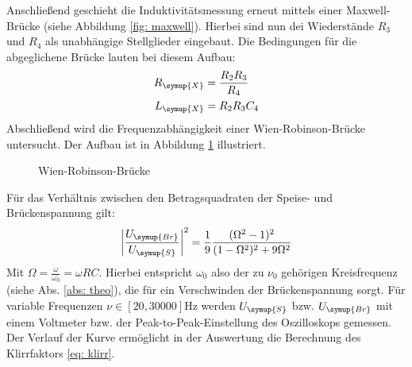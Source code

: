 Anschließend geschieht die Induktivitätsmessung erneut mittels einer Maxwell-Brücke (siehe Abbildung \ref{fig: maxwell}).
Hierbei sind nun dei Wiederstände $R_3$ und $R_4$ als unabhängige Stellglieder eingebaut. Die Bedingungen für die abgeglichene Brücke lauten
bei diesem Aufbau:
\begin{align}
  \begin{aligned}
    R_{\symup{X}} &=\frac{R_2 R_3}{R_4} \\
    L_{\symup{X}} &= R_2 R_3 C_4
  \end{aligned}
  \label{eq: Lx_maxwell}
\end{align}
Abschließend wird die Frequenzabhängigkeit einer Wien-Robinson-Brücke untersucht. Der Aufbau ist in Abbildung
 \ref{fig: wienrob} illustriert.
\begin{figure}
  \centering
  \caption{Wien-Robinson-Brücke\cite{anleitung302}}
  \label{fig: wienrob}
\end{figure}
Für das Verhältnis zwischen den Betragsquadraten der Speise- und Brückenspannung gilt:
\begin{equation}
  \left| \frac{U_{\symup{Br}}}{U_{\symup{S}}}\right|^2 = \frac{1}{9} \frac{(\Omega^2 - 1)^2 }{(1 - \Omega ^2)^2 + 9 \Omega ^2}
\end{equation}
Mit $\Omega = \frac{\omega}{\omega_0} = \omega R C$. Hierbei entspricht $\omega_0$ also der zu $\nu_0$ gehörigen Kreisfrequenz (siehe Abs. \ref{abs: theo}), die
für ein Verschwinden der Brückenspannung sorgt. Für variable Frequenzen $\nu \in [20, \num{30000}]\si{\hertz}$ werden $U_{\symup{S}}$ bzw. $U_{\symup{Br}}$ mit einem
Voltmeter bzw. der Peak-to-Peak-Einstellung des Oszilloskops gemessen. Der Verlauf der Kurve ermöglicht in der Auswertung die Berechnung des Klirrfaktors \eqref{eq: klirr}.
